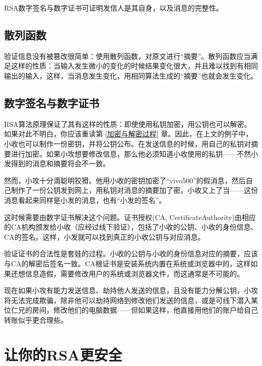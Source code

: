 \documentclass[a4paper]{article}  %
\begin{document}
\begin{sloppypar}
RSA数字签名与数字证书可证明发信人是其自身，以及消息的完整性。

\subsection{散列函数} \label{散列函数}

验证信息没有被篡改很简单：使用散列函数，对原文进行“摘要”。散列函数应当满足这样的性质：当输入发生微小的变化的时候结果变化很大，并且难以找到有相同输出的输入，这样，当消息发生变化，用相同算法生成的“摘要”也就会发生变化。 %

\subsection{数字签名与数字证书}

RSA算法原理保证了其有这样的性质：即使使用私钥加密，用公钥也可以解密。如果对此不明白，你应该重读第 \ref{加密与解密过程} 章。因此，在上文的例子中，小收也可以制作一份密钥，并将公钥公布。在发送信息的时候，用自己的私钥对摘要进行加密。如果小攻想要修改信息，那么他必须知道小收使用的私钥——不然小发得到的消息和摘要将会不一致。

然而，小攻十分滴聪明狡猾。他用小收的密钥加密了“vivo500”的假消息，然后自己制作了一份公钥发到网上，用私钥对消息的摘要加了密。小收又上了当——这份消息看起来同样是小发的消息，也有“小发的签名”。

这时候需要由数字证书解决这个问题。证书授权(CA, CertificateAuthority)由相应的CA机构颁发给小收（应经过线下验证），包括了小收的公钥、小收的身份信息、CA的签名。这样，小发就可以找到真正的小收公钥与对应消息。

验证证书的合法性是套娃的过程。小收的公钥与小收的身份信息对应的摘要，应该与CA的解密后签名一致。CA根证书是安装系统内置在系统或浏览器中的，这样如果还想信息造假，需要修改用户的系统或浏览器文件，而这通常是不可能的。

现在如果小攻有能力发送信息、劫持他人发送的信息，且没有能力分解公钥，小攻将无法完成欺骗，除非他可以劫持网络到修改他们发送的信息，或是可线下潜入某位仁兄的房间，修改他们的电脑数据——但如果这样，他直接用他们的账户给自己转账似乎更合理些。

\section[实现细节]{让你的RSA更安全}




\end{sloppypar} %
\end{document}
